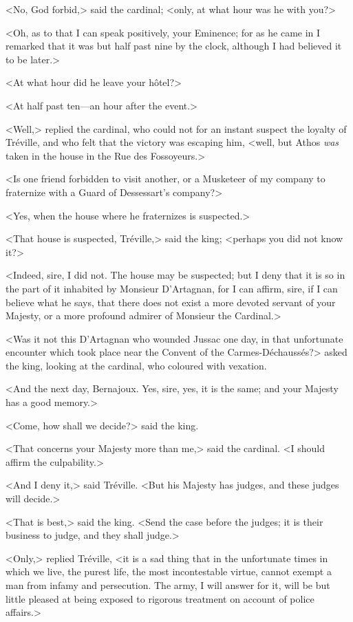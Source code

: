 <No, God forbid,> said the cardinal; <only, at what hour was he with you?> 

<Oh, as to that I can speak positively, your Eminence; for as he came in I remarked that it was but half past nine by the clock, although I had believed it to be later.> 

<At what hour did he leave your hôtel?> 

<At half past ten—an hour after the event.> 

<Well,> replied the cardinal, who could not for an instant suspect the loyalty of Tréville, and who felt that the victory was escaping him, <well, but Athos \emph{was} taken in the house in the Rue des Fossoyeurs.> 

<Is one friend forbidden to visit another, or a Musketeer of my company to fraternize with a Guard of Dessessart's company?> 

<Yes, when the house where he fraternizes is suspected.> 

<That house is suspected, Tréville,> said the king; <perhaps you did not know it?> 

<Indeed, sire, I did not. The house may be suspected; but I deny that it is so in the part of it inhabited by Monsieur D'Artagnan, for I can affirm, sire, if I can believe what he says, that there does not exist a more devoted servant of your Majesty, or a more profound admirer of Monsieur the Cardinal.> 

<Was it not this D'Artagnan who wounded Jussac one day, in that unfortunate encounter which took place near the Convent of the Carmes-Déchaussés?> asked the king, looking at the cardinal, who coloured with vexation. 

<And the next day, Bernajoux. Yes, sire, yes, it is the same; and your Majesty has a good memory.> 

<Come, how shall we decide?> said the king. 

<That concerns your Majesty more than me,> said the cardinal. <I should affirm the culpability.> 

<And I deny it,> said Tréville. <But his Majesty has judges, and these judges will decide.> 

<That is best,> said the king. <Send the case before the judges; it is their business to judge, and they shall judge.> 

<Only,> replied Tréville, <it is a sad thing that in the unfortunate times in which we live, the purest life, the most incontestable virtue, cannot exempt a man from infamy and persecution. The army, I will answer for it, will be but little pleased at being exposed to rigorous treatment on account of police affairs.> 


